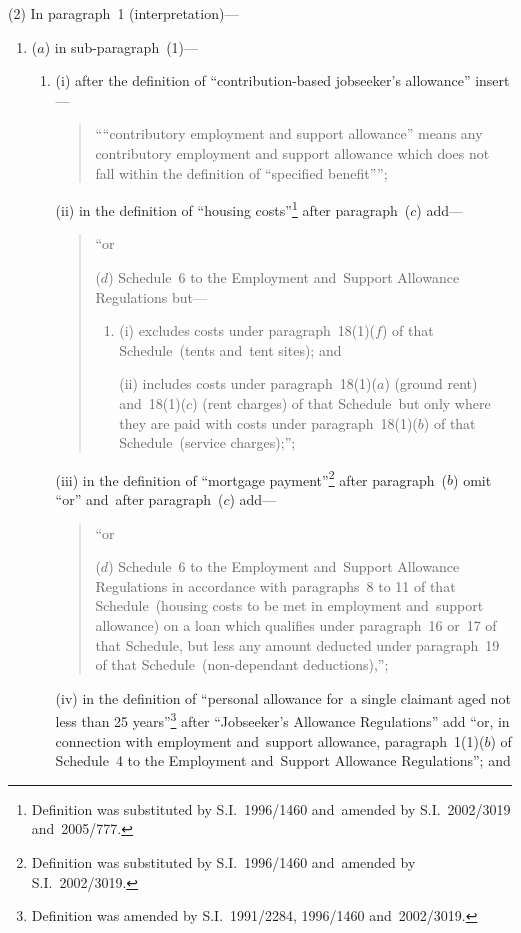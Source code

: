 \documentclass[12pt,a4paper]{article}
\begin{document}
(2) In paragraph~1 (interpretation)—
\begin{enumerate}\item[]
($a$) in sub-paragraph~(1)—
\begin{enumerate}\item[]
(i) after the definition of “contribution-based jobseeker’s allowance” insert—
\begin{quotation}\sloppy
““contributory employment and support allowance” means any contributory employment and support allowance which does not fall within the definition of “specified benefit””;
\end{quotation}

(ii) in the definition of “housing costs”\footnote{Definition was substituted by S.I.~1996/1460 and~amended by S.I.~2002/3019 and~2005/777.} after paragraph~($c$)  add—
\begin{quotation}
“or

($d$) Schedule~6 to the Employment and~Support Allowance Regulations but—
\begin{enumerate}\item[]
(i) excludes costs under paragraph~18(1)($f$)  of that Schedule~(tents and~tent sites); and

\begin{sloppypar}
(ii) includes costs under paragraph~18(1)($a$)  (ground rent) and~18(1)($c$)  (rent charges) of that Schedule~but only where they are paid with costs under paragraph~18(1)($b$)  of that Schedule~(service charges);”;
\end{sloppypar}
\end{enumerate}
\end{quotation}

(iii) in the definition of “mortgage payment”\footnote{Definition was substituted by S.I.~1996/1460 and~amended by S.I.~2002/3019.} after paragraph~($b$)  omit “or” and~after paragraph~($c$)  add—
\begin{quotation}
“or

($d$) Schedule~6 to the Employment and~Support Allowance Regulations in accordance with paragraphs~8 to 11 of that Schedule~(housing costs to be met in employment and~support allowance) on a loan which qualifies under paragraph~16 or~17 of that Schedule, but less any amount deducted under paragraph~19 of that Schedule~(non-dependant deductions),”;
\end{quotation}

(iv) in the definition of “personal allowance for~a single claimant aged not less than 25 years”\footnote{Definition was amended by S.I.~1991/2284, 1996/1460 and~2002/3019.} after “Jobseeker’s Allowance Regulations” add “or, in connection with employment and~support allowance, paragraph~1(1)($b$)  of Schedule~4 to the Employment and~Support Allowance Regulations”; and


\end{enumerate}
\end{enumerate}
\end{document}
